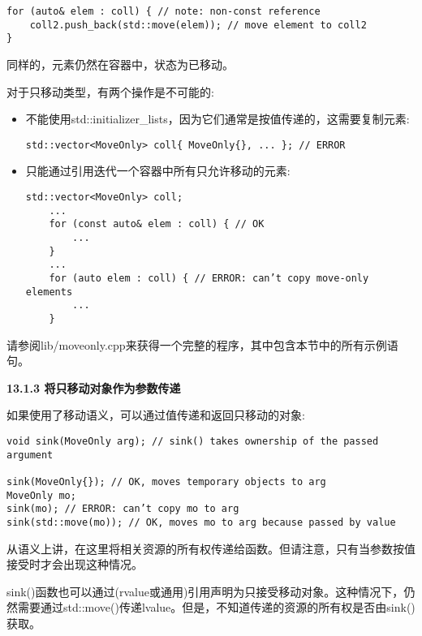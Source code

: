 \begin{lstlisting}[caption={}]
for (auto& elem : coll) { // note: non-const reference
	coll2.push_back(std::move(elem)); // move element to coll2
}
\end{lstlisting}

同样的，元素仍然在容器中，状态为已移动。\par

对于只移动类型，有两个操作是不可能的:\par

\begin{itemize}
	\item 不能使用std::initializer\_lists，因为它们通常是按值传递的，这需要复制元素:
	\begin{lstlisting}[caption={}]
	std::vector<MoveOnly> coll{ MoveOnly{}, ... }; // ERROR
	\end{lstlisting}
	\item 只能通过引用迭代一个容器中所有只允许移动的元素:
	\begin{lstlisting}[caption={}]
	std::vector<MoveOnly> coll;
	...
	for (const auto& elem : coll) { // OK
		...
	}
	...
	for (auto elem : coll) { // ERROR: can’t copy move-only elements
		...
	}
	\end{lstlisting}
\end{itemize}

请参阅lib/moveonly.cpp来获得一个完整的程序，其中包含本节中的所有示例语句。\par

\hspace*{\fill} \par %
\textbf{13.1.3 将只移动对象作为参数传递}

如果使用了移动语义，可以通过值传递和返回只移动的对象:\par

\begin{lstlisting}[caption={}]
void sink(MoveOnly arg); // sink() takes ownership of the passed argument

sink(MoveOnly{}); // OK, moves temporary objects to arg
MoveOnly mo;
sink(mo); // ERROR: can’t copy mo to arg
sink(std::move(mo)); // OK, moves mo to arg because passed by value
\end{lstlisting}

从语义上讲，在这里将相关资源的所有权传递给函数。但请注意，只有当参数按值接受时才会出现这种情况。\par

sink()函数也可以通过(rvalue或通用)引用声明为只接受移动对象。这种情况下，仍然需要通过std::move()传递lvalue。但是，不知道传递的资源的所有权是否由sink()获取。\par

